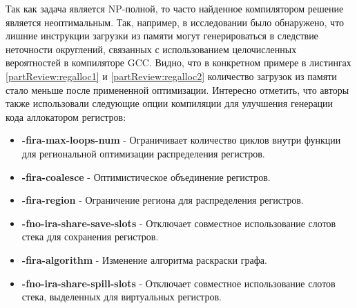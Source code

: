 Так как задача является NP-полной, то часто найденное компилятором решение является неоптимальным. Так, например, в исследовании  \cite{melnik2010case} было обнаружено, что лишние инструкции загрузки из памяти могут генерироваться в следствие неточности округлений, связанных с использованием целочисленных вероятностей в компиляторе GCC.  Видно, что в конкретном примере в листингах \ref{partReview:regalloc1} и  \ref{partReview:regalloc2} количество загрузок из памяти стало меньше после примененной оптимизации. Интересно отметить, что авторы также использовали следующие опции компиляции для улучшения генерации кода аллокатором регистров:
\begin{itemize}
\item \textbf{-fira-max-loops-num} - Ограничивает количество циклов внутри функции для региональной оптимизации распределения регистров.
\item \textbf{-fira-coalesce} - Оптимистическое объединение регистров.
\item \textbf{-fira-region} - Ограничение региона для распределения регистров.
\item \textbf{-fno-ira-share-save-slots} - Отключает совместное использование слотов стека для сохранения регистров.
\item \textbf{-fira-algorithm} - Изменение алгоритма раскраски графа.
\item \textbf{-fno-ira-share-spill-slots} - Отключает совместное использование слотов стека, выделенных для виртуальных регистров.
\end{itemize}




